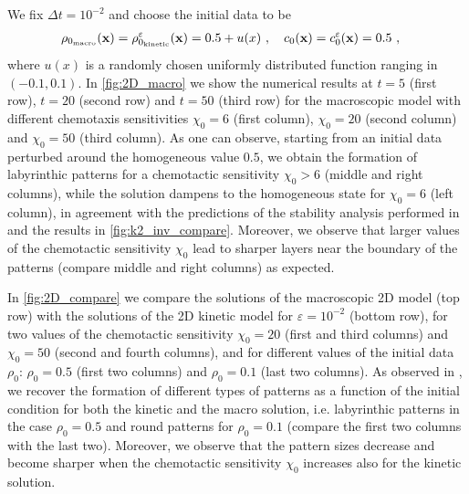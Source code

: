 \documentclass[review,onefignum,onetabnum]{siamart220329}
\begin{document}
We fix $\Delta t = 10^{-2}$ and choose the initial data to be
\begin{align*}
	&\rho_{0_\textnormal{macro}}(\mathbf{x}) =  \rho_{0_\textnormal{kinetic}}^\varepsilon(\mathbf{x}) =  0.5+u(x)\ , \quad c_0(\mathbf{x}) = c_0^\varepsilon(\mathbf{x}) = 0.5\ , %
\end{align*}
where $u(x)$ is a randomly chosen uniformly distributed function ranging in $(-0.1, 0.1)$. 
In \cref{fig:2D_macro} we show the numerical results at $t=5$ (first row), $t=20$ (second row) and $t=50$ (third row) for the macroscopic model with different chemotaxis sensitivities $\chi_0=6$ (first column), $\chi_0=20$ (second column) and $\chi_0=50$ (third column). As one can observe, starting from an initial data perturbed around the homogeneous value $0.5$, we obtain the formation of labyrinthic patterns for a chemotactic sensitivity $\chi_0>6$ (middle and right columns), while the solution dampens to the homogeneous state for $\chi_0=6$ (left column), in agreement with the predictions of the stability analysis performed in \cite{almeida2020treatment} and the results in \cref{fig:k2_inv_compare}. Moreover, we observe that larger values of the chemotactic sensitivity $\chi_0$ {lead} to sharper layers near the boundary of the patterns (compare middle and right columns) as expected. 

In \cref{fig:2D_compare} we compare the solutions of the macroscopic 2D model (top row) with the solutions of the 2D kinetic model for $\varepsilon = 10^{-2}$ (bottom row), for two values of the chemotactic sensitivity $\chi_0 = 20$ (first and third columns) and $\chi_0 = 50$ (second and fourth columns), and for different values of the initial data $\rho_0$: $\rho_0 = 0.5$ (first two columns) and $\rho_0 = 0.1$ (last two columns). As observed in \cite{painter2002volume}, we recover the formation of different types of patterns as a function of the initial condition for both the kinetic and the macro solution, i.e. labyrinthic patterns in the case $\rho_0 = 0.5$ and round patterns for $\rho_0 = 0.1$ (compare the first two columns with the last two). Moreover, we observe that the pattern sizes decrease and become sharper when the chemotactic sensitivity $\chi_0$ increases also for the kinetic solution.%
\end{document}

